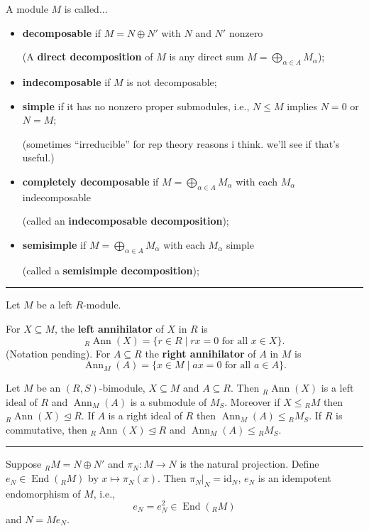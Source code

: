 \documentclass[12pt]{article}
\newcommand{\keyword}[1]{\textbf{#1}}
\newcommand{\sepline}{\rule{\textwidth}{0.4pt}}
\theoremstyle{definition}
\newcommand{\<}{\left\langle}
\renewcommand{\>}{\right\rangle}
\newcommand{\seq}{\subseteq}
\newcommand{\teq}{\trianglelefteq}
\newcommand{\id}{\mathrm{id}}
\DeclareMathOperator{\End}{End}
\DeclareMathOperator{\Ann}{Ann}
\renewcommand{\_}[1]{{_{#1}}}
\begin{document}
A module $M$ is called...
\begin{itemize}
    \item \keyword{decomposable} if $M = N \oplus N'$ with $N$ and $N'$ nonzero

    (A \keyword{direct decomposition} of $M$ is any direct sum $M = \bigoplus_{\alpha \in A} M_\alpha$);

    \item \keyword{indecomposable} if $M$ is not decomposable;

    \item \keyword{simple} if it has no nonzero proper submodules, i.e., $N \leq M$ implies $N = 0$ or $N = M$;

    (sometimes ``irreducible'' for rep theory reasons i think. we'll see if that's useful.)
    
    \item \keyword{completely decomposable} if $M = \bigoplus_{\alpha \in A} M_\alpha$ with each $M_\alpha$ indecomposable

    (called an \keyword{indecomposable decomposition});
    
    \item \keyword{semisimple} if $M = \bigoplus_{\alpha \in A} M_\alpha$ with each $M_\alpha$ simple

    (called a \keyword{semisimple decomposition});
\end{itemize}






\sepline

Let $M$ be a left $R$-module.

For $X \seq M$, the \keyword{left annihilator} of $X$ in $R$ is
\[
    \_R\!\Ann(X) = \{r \in R \mid rx = 0 \text{ for all } x \in X\}.
\]
(Notation pending).
For $A \seq R$ the \keyword{right annihilator} of $A$ in $M$ is
\[
    \Ann_M(A) = \{x \in M \mid ax = 0 \text{ for all } a \in A\}.
\]

Let $M$ be an $(R, S)$-bimodule, $X \seq M$ and $A \seq R$.
Then $\_R\!\Ann(X)$ is a left ideal of $R$ and $\Ann_M(A)$ is a submodule of $M_S$.
Moreover if $X \leq \_RM$ then $\_R\!\Ann(X) \teq R$.
If $A$ is a right ideal of $R$ then $\Ann_M(A) \leq \_RM_S$.
If $R$ is commutative, then $\_R\!\Ann(X) \teq R$ and $\Ann_M(A) \leq \_RM_S$.

\sepline

Suppose $\_RM = N \oplus N'$ and $\pi_N : M \to N$ is the natural projection.
Define $e_N \in \End(\_RM)$ by $x \mapsto \pi_N(x)$.
Then $\pi_N|_{N} = \id_N$, $e_N$ is an idempotent endomorphism of $M$, i.e.,
\[
    e_N = e_N^2 \in \End(\_RM)
\]
and $N = Me_N$.
\end{document}
